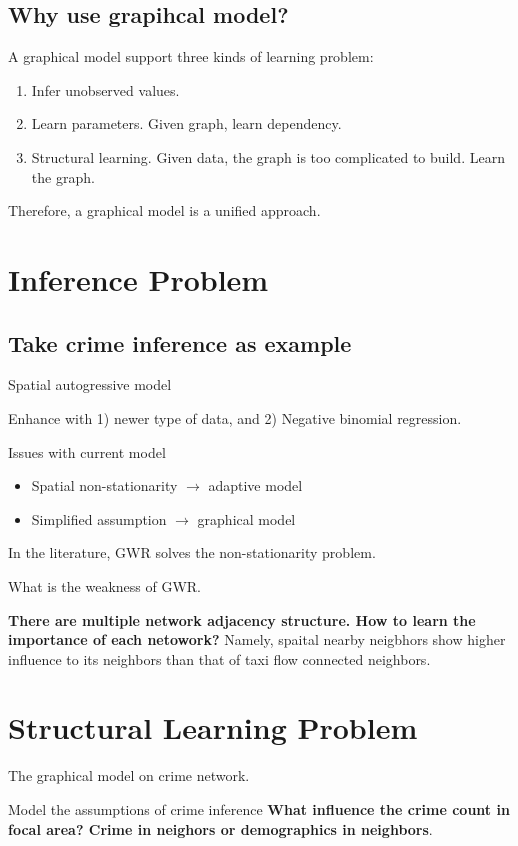 \documentclass{article}
\begin{document}
\subsection{Why use grapihcal model?}

A graphical model support three kinds of learning problem:

\begin{enumerate}
\item Infer unobserved values.
\item Learn parameters.  Given graph, learn dependency.
\item Structural learning. Given data, the graph is too complicated to build. Learn the graph.
\end{enumerate}

Therefore,  a graphical model is a unified approach.






\section{Inference Problem}

\subsection{Take crime inference as example}

Spatial autogressive model


Enhance with 1) newer type of data, and 2) Negative binomial regression.



Issues with current model

\begin{itemize}
\item Spatial non-stationarity  $\rightarrow$ adaptive model
\item Simplified assumption  $\rightarrow$ graphical model
\end{itemize}


In the literature, GWR solves the non-stationarity problem.

What is the weakness of GWR.

\textbf{There are multiple network adjacency structure. How to learn the importance of each netowork?} Namely, spaital nearby neigbhors show higher influence to its neighbors than that of taxi flow connected neighbors.





\section{Structural Learning Problem}

The graphical model on crime network.




Model the assumptions of crime inference
\textbf{What influence the crime count in focal area? Crime in neighors or demographics in neighbors}.
\end{document}

